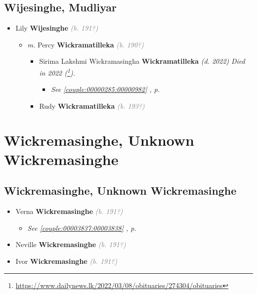 \documentclass[10pt, openany]{book}
\begin{document}
\chapter{Wijesinghe, Mudliyar}
\label{00001006}
\textcolor{slmaroon}{\textit{}}
\begin{itemize}
\item{Lily \textbf{Wijesinghe} \textcolor{gray}{\textit{(b. 191?)}}
\begin{itemize}
\item{\textit{m.} Percy \textbf{Wickramatilleka} \textcolor{gray}{\textit{(b. 190?)}}   \label{couple:00000981:00001002} \begin{itemize}
\item{Sirima Lakshmi Wickramasingha \textbf{Wickramatilleka} \textcolor{slorange}{\textit{(d. 2022)}} \textcolor{slmaroon}{\textit{Died in 2022 (\footnote{\url{https://www.dailynews.lk/2022/03/08/obituaries/274304/obituaries}}).}}
\begin{itemize}
\item{\textcolor{slteal}{\textit{See  \autoref{couple:00000285:00000982} \textit{, p. \pageref{couple:00000285:00000982} }}}}
\end{itemize}
   }
\item{Rudy \textbf{Wickramatilleka} \textcolor{gray}{\textit{(b. 193?)}}
 }
\end{itemize}}
\end{itemize}
 }
\end{itemize}
 
\part{Wickremasinghe, Unknown Wickremasinghe}
\chapter{Wickremasinghe, Unknown Wickremasinghe}
\label{00003839}
\textcolor{slmaroon}{\textit{}}
\begin{itemize}
\item{Verna \textbf{Wickremasinghe} \textcolor{gray}{\textit{(b. 191?)}}
\begin{itemize}
\item{\textcolor{slteal}{\textit{See  \autoref{couple:00003837:00003838} \textit{, p. \pageref{couple:00003837:00003838} }}}}
\end{itemize}
 }
\item{Neville \textbf{Wickremasinghe} \textcolor{gray}{\textit{(b. 191?)}}
 }
\item{Ivor \textbf{Wickremasinghe} \textcolor{gray}{\textit{(b. 191?)}}
 }
\end{itemize}
  
\end{document}
